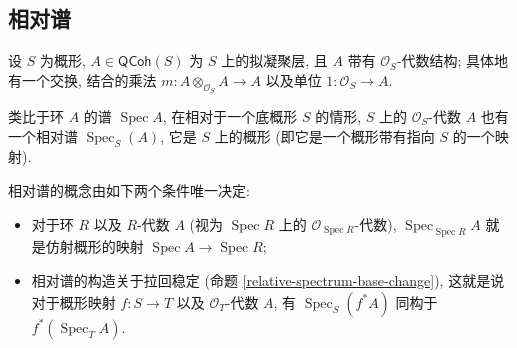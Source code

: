 \documentclass{book}
\begin{document}
	\subsection{相对谱}
	
	设 $S$ 为概形, $A\in\mathsf{QCoh}(S)$ 为 $S$ 上的拟凝聚层, 且 $A$ 带有 $\mathcal O_S$-代数结构; 具体地有一个交换, 结合的乘法 $m\colon A\otimes_{\mathcal O_S}A\to A$ 以及单位 $1\colon \mathcal O_S\to A$.
	
	类比于环 $A$ 的谱 $\operatorname{Spec} A$, 在相对于一个底概形 $S$ 的情形, $S$ 上的 $\mathcal O_S$-代数 $A$ 也有一个相对谱 $\operatorname{Spec}_S (A)$, 它是 $S$ 上的概形 (即它是一个概形带有指向 $S$ 的一个映射).
	
	相对谱的概念由如下两个条件唯一决定:
	\begin{itemize}
		\item 对于环 $R$ 以及 $R$-代数 $A$ (视为 $\operatorname{Spec} R$ 上的 $\mathcal O_{\operatorname{Spec} R}$-代数), $\operatorname{Spec}_{\operatorname{Spec} R}A$ 就是仿射概形的映射 $\operatorname{Spec} A\to\operatorname{Spec} R$;
		\item 相对谱的构造关于拉回稳定 (命题 \ref{relative-spectrum-base-change}), 这就是说对于概形映射 $f\colon S\to T$ 以及 $\mathcal O_T$-代数 $A$, 有 $\operatorname{Spec}_S(f^*A)$ 同构于 $f^* (\operatorname{Spec}_T A)$.
	\end{itemize}
	
\end{document}

